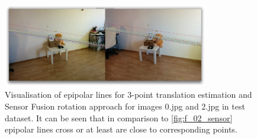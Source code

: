 \begin{figure}[h!]
    \centering
    \includegraphics[width=0.8\textwidth]{f_02_3point}
    \caption[Visualisation of epipolar lines for 3-point translation estimation and Sensor Fusion rotation approach - 2nd example]{Visualisation of epipolar lines for 3-point translation estimation and Sensor Fusion rotation approach for images 0.jpg and 2.jpg in test dataset. It can be seen that in comparison to \ref{fig:f_02_sensor} epipolar lines cross or at least are close to corresponding points.}
    \label{fig:f_02_3point}
\end{figure}



